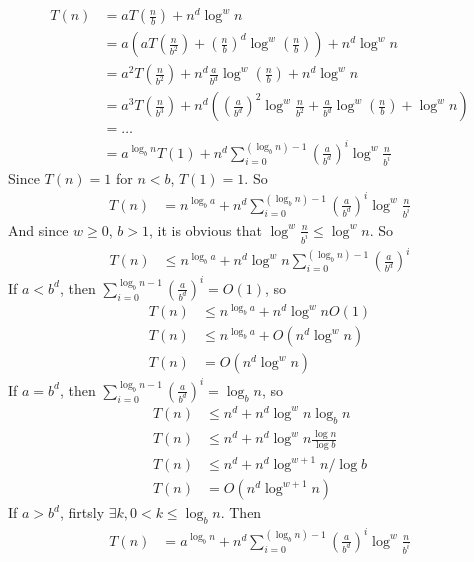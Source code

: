 \documentclass[12pt,letterpaper]{article}
\begin{document}
\section{}
\begin{align}
    T(n)&=aT(\frac{n}{b})+n^d\log^wn\\
    &=a(aT(\frac{n}{b^2})+(\frac{n}{b})^d\log^w(\frac{n}{b}))+n^d\log^wn\\
    &=a^2T(\frac{n}{b^2})+n^d\frac{a}{b^d}\log^w(\frac{n}{b})+n^d\log^wn\\
    &=a^3T(\frac{n}{b^3})+n^d((\frac{a}{b^d})^2\log^w\frac{n}{b^2}+\frac{a}{b^d}\log^w(\frac{n}{b})+\log^wn)\\
    &=\dots\\
    &=a^{\log_bn}T(1)+n^d\sum_{i=0}^{(\log_bn)-1}(\frac{a}{b^d})^i\log^w{\frac{n}{b^i}}
\end{align}
Since $T(n)=1$ for $n<b$, $T(1)=1$. So 
\begin{align}
    T(n)&=n^{\log_ba}+n^d\sum_{i=0}^{(\log_bn)-1}(\frac{a}{b^d})^i\log^w{\frac{n}{b^i}}
\end{align}
And since $w\geq0$, $b>1$, it is obvious that $\log^w\frac{n}{b^i}\leq\log^wn$. So \\
\begin{align}
    T(n)&\leq n^{\log_ba}+n^d\log^wn\sum_{i=0}^{(\log_bn)-1}(\frac{a}{b^d})^i
\end{align}
If $a<b^d$, then $\sum_{i=0}^{\log_bn-1}(\frac{a}{b^d})^i=O(1)$, so
\begin{align}
    T(n)&\leq n^{\log_ba}+n^d\log^wnO(1)\\
    T(n)&\leq n^{\log_ba}+O(n^d\log^wn)\\
    T(n)&=O(n^d\log^wn)
\end{align}
If $a=b^d$, then $\sum_{i=0}^{\log_bn-1}(\frac{a}{b^d})^i=\log_bn$, so
\begin{align}
    T(n)&\leq n^d+n^d\log^wn\log_bn\\
    T(n)&\leq n^d+n^d\log^wn\frac{\log n}{\log b}\\
    T(n)&\leq n^d+n^d\log^{w+1}n/\log b\\
    T(n)&=O(n^d\log^{w+1}n)
\end{align}
If $a>b^d$, firtsly $\exists k, 0<k\leq \log_bn$. Then 
\begin{align}
    T(n)&=a^{\log_bn}+n^d\sum_{i=0}^{(\log_bn)-1}(\frac{a}{b^d})^i\log^w{\frac{n}{b^i}}
\end{align}

\section{}
\end{document}
